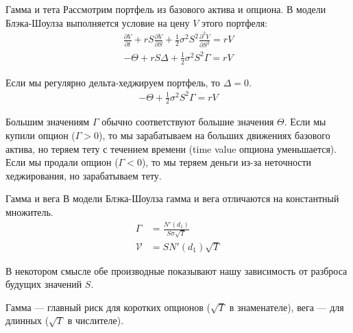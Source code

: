 \documentclass{beamer}
\begin{document}
\begin{frame}{Гамма и тета}
\justify
Рассмотрим портфель из базового актива и опциона. В модели Блэка-Шоулза выполняется условие на цену $V$ этого портфеля:
\begin{align*}
\frac{\partial V}{\partial t} + rS\frac{\partial V}{\partial S} + \frac{1}{2}\sigma^2S^2\frac{\partial^2 V}{\partial S^2} = rV
\end{align*}
\begin{align*}
-\Theta + rS\Delta + \frac{1}{2}\sigma^2S^2\Gamma = rV
\end{align*}

Если мы регулярно дельта-хеджируем портфель, то $\Delta=0$.
\begin{align*}
-\Theta + \frac{1}{2}\sigma^2S^2\Gamma = rV
\end{align*}

\justify
Большим значениям $\Gamma$ обычно соответствуют большие значения $\Theta$. Если мы купили опцион ($\Gamma > 0$), то мы зарабатываем на больших движениях базового актива, но теряем тету с течением времени (time value опциона уменьшается). Если мы продали опцион ($\Gamma < 0$), то мы теряем деньги из-за неточности хеджирования, но зарабатываем тету.
\end{frame}



\begin{frame}{Гамма и вега}
\justify
В модели Блэка-Шоулза гамма и вега отличаются на константный множитель.
\begin{align*}
\Gamma &= \frac{N'(d_1)}{S\sigma\sqrt{T}} \\
\mathcal{V} &= SN'(d_1)\sqrt{T}
\end{align*}

\justify
В некотором смысле обе производные показывают нашу зависимость от разброса будущих значений $S$.

\justify
Гамма --- главный риск для коротких опционов ($\sqrt{T}$ в знаменателе), вега --- для длинных ($\sqrt{T}$ в числителе). 
\end{frame}
\end{document}
